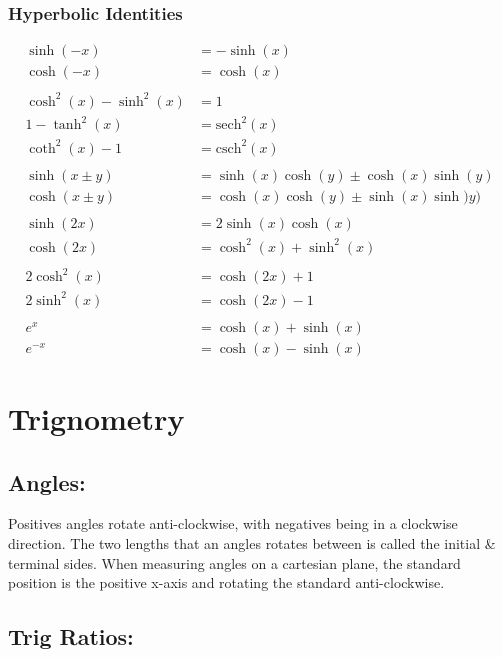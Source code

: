 \documentclass[a5paper]{article}
\newcommand{\sech}{\mathrm{sech}}
\newcommand{\csch}{\mathrm{csch}}
\begin{document}
	\subsubsection{Hyperbolic Identities}
	\begin{align*}
		\sinh(-x)&=-\sinh(x)\\
		\cosh(-x)&=\cosh(x)\\\\
		\cosh^{2}(x)-\sinh^{2}(x)&=1\\
		1-\tanh^{2}(x)&=\sech^{2}(x)\\
		\coth^{2}(x)-1&=\csch^{2}(x)\\\\
		\sinh(x\pm y)&=\sinh(x)\cosh(y)\pm\cosh(x)\sinh(y)\\
		\cosh(x\pm y)&=\cosh(x)\cosh(y)\pm\sinh(x)\sinh)y)\\\\
		\sinh(2x)&=2\sinh(x)\cosh(x)\\
		\cosh(2x)&=\cosh^{2}(x)+\sinh^{2}(x)\\\\
		2\cosh^{2}(x)&=\cosh(2x)+1\\
		2\sinh^{2}(x)&=\cosh(2x)-1\\\\
		e^{x}&=\cosh(x)+\sinh(x)\\
		e^{-x}&=\cosh(x)-\sinh(x)
	\end{align*}

	\pagebreak

	\section{Trignometry}
	\subsection{Angles:}
	Positives angles rotate anti-clockwise, with negatives being in a clockwise direction. The two lengths that an angles rotates between is called the initial \& terminal sides. When measuring angles on a cartesian plane, the standard position is the positive x-axis and rotating the standard anti-clockwise.

	\subsection{Trig Ratios:}
	\begin{center}
	\end{center}
\end{document}
